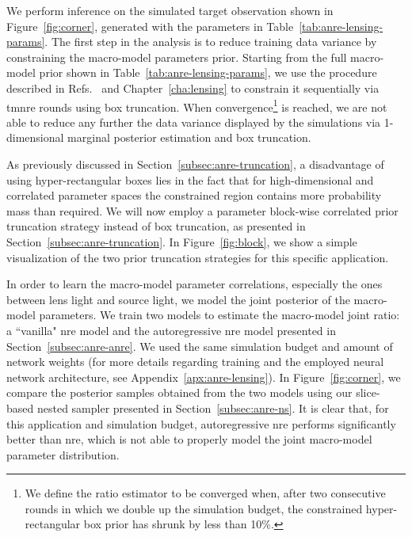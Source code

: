 We perform inference on the simulated target observation shown in Figure~\ref{fig:corner}, generated with the parameters in Table~\ref{tab:anre-lensing-params}. The first step in the analysis is to reduce training data variance by constraining the macro-model parameters prior. Starting from the full macro-model prior shown in Table~\ref{tab:anre-lensing-params}, we use the procedure described in Refs.~\cite{Coogan:2022cky, Montel:2022fhv} and Chapter~\ref{cha:lensing} to constrain it sequentially via \gls*{tmnre} rounds using box truncation. When convergence\footnote{We define the ratio estimator to be converged when, after two consecutive rounds in which we double up the simulation budget, the constrained hyper-rectangular box prior has shrunk by less than 10\%.} is reached, we are not able to reduce any further the data variance displayed by the simulations via 1-dimensional marginal posterior estimation and box truncation.

As previously discussed in Section~\ref{subsec:anre-truncation}, a disadvantage of using hyper-rectangular boxes lies in the fact that for high-dimensional and correlated parameter spaces the constrained region contains more probability mass than required. We will now employ a parameter block-wise correlated prior truncation strategy instead of box truncation, as presented in Section~\ref{subsec:anre-truncation}. In Figure~\ref{fig:block}, we show a simple visualization of the two prior truncation strategies for this specific application.

In order to learn the macro-model parameter correlations, especially the ones between lens light and source light, we model the joint posterior of the  macro-model parameters. We train two models to estimate the macro-model joint ratio: a ``vanilla" \gls*{nre} model and the autoregressive \gls*{nre} model presented in Section~\ref{subsec:anre-anre}. We used the same simulation budget and amount of network weights (for more details regarding training and the employed neural network architecture, see Appendix~\ref{apx:anre-lensing}). In Figure~\ref{fig:corner}, we compare the posterior samples obtained from the two models using our slice-based nested sampler presented in Section~\ref{subsec:anre-ns}. It is clear that, for this application and simulation budget, autoregressive \gls*{nre} performs significantly better than \gls*{nre}, which is not able to properly model the joint macro-model parameter distribution.

